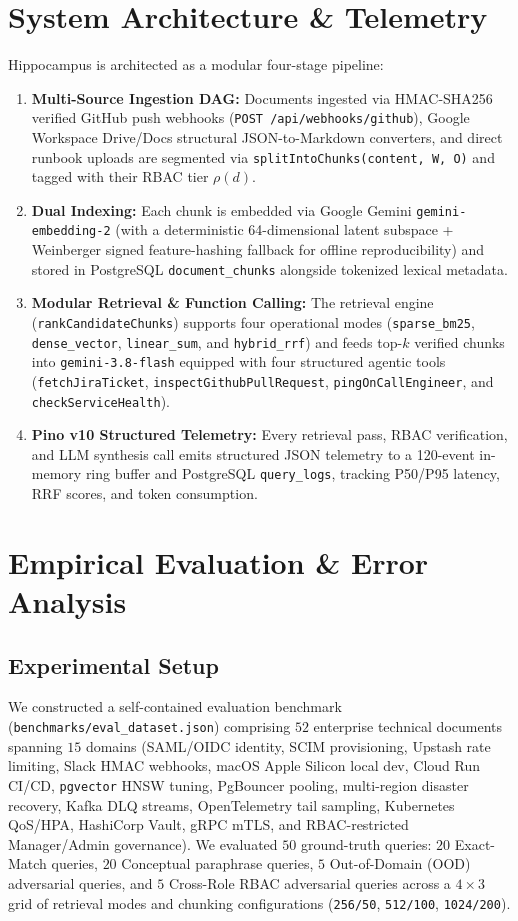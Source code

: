 \documentclass[conference]{IEEEtran}
\begin{document}
\section{System Architecture \& Telemetry}
Hippocampus is architected as a modular four-stage pipeline:
\begin{enumerate}
    \item \textbf{Multi-Source Ingestion DAG:} Documents ingested via HMAC-SHA256 verified GitHub push webhooks (\texttt{POST /api/webhooks/github}), Google Workspace Drive/Docs structural JSON-to-Markdown converters, and direct runbook uploads are segmented via \texttt{splitIntoChunks(content, W, O)} and tagged with their RBAC tier $\rho(d)$.
    \item \textbf{Dual Indexing:} Each chunk is embedded via Google Gemini \texttt{gemini-embedding-2} (with a deterministic 64-dimensional latent subspace + Weinberger signed feature-hashing fallback for offline reproducibility) and stored in PostgreSQL \texttt{document\_chunks} alongside tokenized lexical metadata.
    \item \textbf{Modular Retrieval \& Function Calling:} The retrieval engine (\texttt{rankCandidateChunks}) supports four operational modes (\texttt{sparse\_bm25}, \texttt{dense\_vector}, \texttt{linear\_sum}, and \texttt{hybrid\_rrf}) and feeds top-$k$ verified chunks into \texttt{gemini-3.8-flash} equipped with four structured agentic tools (\texttt{fetchJiraTicket}, \texttt{inspectGithubPullRequest}, \texttt{pingOnCallEngineer}, and \texttt{checkServiceHealth}).
    \item \textbf{Pino v10 Structured Telemetry:} Every retrieval pass, RBAC verification, and LLM synthesis call emits structured JSON telemetry to a 120-event in-memory ring buffer and PostgreSQL \texttt{query\_logs}, tracking P50/P95 latency, RRF scores, and token consumption.
\end{enumerate}

\section{Empirical Evaluation \& Error Analysis}

\subsection{Experimental Setup}
We constructed a self-contained evaluation benchmark (\texttt{benchmarks/eval\_dataset.json}) comprising $52$ enterprise technical documents spanning $15$ domains (SAML/OIDC identity, SCIM provisioning, Upstash rate limiting, Slack HMAC webhooks, macOS Apple Silicon local dev, Cloud Run CI/CD, \texttt{pgvector} HNSW tuning, PgBouncer pooling, multi-region disaster recovery, Kafka DLQ streams, OpenTelemetry tail sampling, Kubernetes QoS/HPA, HashiCorp Vault, gRPC mTLS, and RBAC-restricted Manager/Admin governance). We evaluated $50$ ground-truth queries: $20$ Exact-Match queries, $20$ Conceptual paraphrase queries, $5$ Out-of-Domain (OOD) adversarial queries, and $5$ Cross-Role RBAC adversarial queries across a $4 \times 3$ grid of retrieval modes and chunking configurations (\texttt{256/50}, \texttt{512/100}, \texttt{1024/200}).
\end{document}

